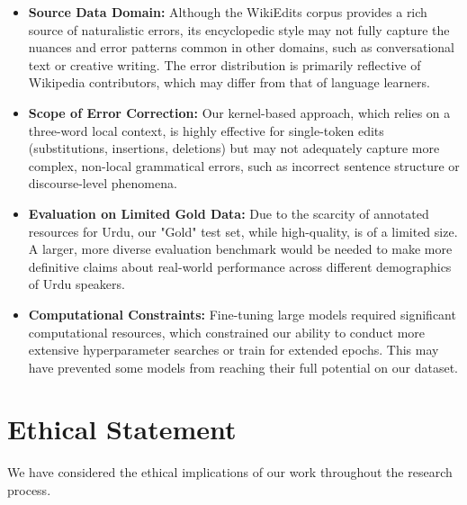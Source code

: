 \documentclass[11pt]{article}
\begin{document}
\begin{itemize}
    \item \textbf{Source Data Domain:} Although the WikiEdits corpus provides a rich source of naturalistic errors, its encyclopedic style may not fully capture the nuances and error patterns common in other domains, such as conversational text or creative writing. The error distribution is primarily reflective of Wikipedia contributors, which may differ from that of language learners.

    \item \textbf{Scope of Error Correction:} Our kernel-based approach, which relies on a three-word local context, is highly effective for single-token edits (substitutions, insertions, deletions) but may not adequately capture more complex, non-local grammatical errors, such as incorrect sentence structure or discourse-level phenomena.

    \item \textbf{Evaluation on Limited Gold Data:} Due to the scarcity of annotated resources for Urdu, our "Gold" test set, while high-quality, is of a limited size. A larger, more diverse evaluation benchmark would be needed to make more definitive claims about real-world performance across different demographics of Urdu speakers.

    \item \textbf{Computational Constraints:} Fine-tuning large models required significant computational resources, which constrained our ability to conduct more extensive hyperparameter searches or train for extended epochs. This may have prevented some models from reaching their full potential on our dataset.
\end{itemize}

\section{Ethical Statement}
\label{sec:ethics}

We have considered the ethical implications of our work throughout the research process.
\end{document}
